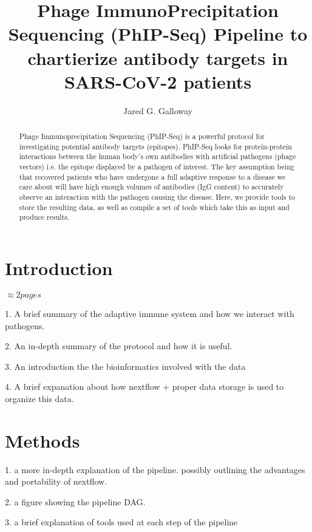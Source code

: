 \documentclass{article}
\title{Phage ImmunoPrecipitation Sequencing (PhIP-Seq) Pipeline to chartierize antibody targets in SARS-CoV-2 patients}
\author{Jared G. Galloway}
\begin{document}
\maketitle

\begin{abstract}
Phage Immunoprecipitation Sequencing (PhIP-Seq) is a powerful protocol for investigating potential antibody targets (epitopes). 
PhIP-Seq looks for protein-protein interactions between the human body's own antibodies with artificial pathogens (phage vectors) i.e. the epitope displayed by a pathogen of interest. 
The key assumption being that recovered patients who have undergone a full adaptive response to a disease we care about will have high enough volumes of antibodies (IgG content) to accurately observe an interaction with the pathogen causing the disease. 
Here, we provide tools to store the resulting data, as well as compile a set of tools which take this as input and produce results.
\end{abstract}

\section*{Introduction}

$\approx 2 pages$

1. A brief summary of the adaptive immune system and how we interact with pathogens.

2. An in-depth summary of the protocol and how it is useful. 

3. An introduction the the bioinformatics involved with the data

4. A brief expanation about how nextflow + proper data storage is used to organize this data.

\section*{Methods}

1. a more in-depth explanation of the pipeline. possibly outlining the advantages and portability of nextflow.

2. a figure showing the pipeline DAG.

3. a brief explanation of tools used at each step of the pipeline

\end{document}
